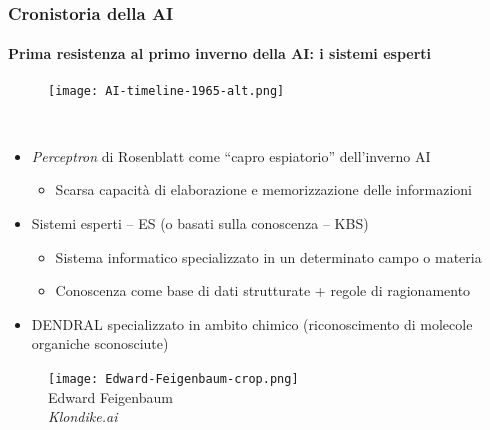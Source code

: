 \begin{frame}[t,fragile] \frametitle{Cronistoria della AI}
{\scriptsize
{}
\framesubtitle{Prima resistenza al primo inverno della AI: i sistemi esperti}
\vspace*{-.5cm}
	\begin{minipage}[t]{\textwidth}
		\begin{figure}[ht]
			\centering
			\texttt{[image: AI-timeline-1965-alt.png]}
		\end{figure}
	\end{minipage}
	\\\vspace*{.3cm}
	\begin{minipage}[t]{\textwidth}
		\begin{minipage}[t]{0.6\textwidth}
			\begin{itemize}[leftmargin=10pt,align=right]
				\onslide<2->\item[\alert{\faHandORight}] \emph{Perceptron} di Rosenblatt come ``capro espiatorio'' dell'inverno AI
				\begin{itemize}[leftmargin=10pt,align=right]
					\item[\alert{\faHandORight}] Scarsa capacità di \alert{elaborazione} e \alert{memorizzazione} delle informazioni
				\end{itemize}
				\item[\alert{\faHandORight}] \alert{Sistemi esperti} -- ES (o \alert{basati sulla conoscenza} -- KBS)
				\begin{itemize}[leftmargin=10pt,align=right]
					\item[\alert{\faHandORight}] Sistema informatico specializzato in un determinato campo o materia
					\item[\alert{\faHandORight}] Conoscenza come base di dati strutturate + regole di ragionamento
				\end{itemize}
				\item[\alert{\faHandORight}] DENDRAL specializzato in ambito \alert{chimico} (riconoscimento di molecole organiche sconosciute)
			\end{itemize}
		\end{minipage}
		\begin{minipage}[t]{0.4\textwidth}
			\centering
			\begin{figure}[ht]
				\texttt{[image: Edward-Feigenbaum-crop.png]}
				{\tiny\\Edward Feigenbaum\\\textit{\textcopyright Klondike.ai}}
			\end{figure}
		\end{minipage}
	\end{minipage}
}
\end{frame}
